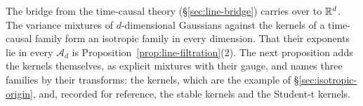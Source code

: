 The bridge from the time-causal theory (\S\ref{sec:line-bridge}) carries over to $\mathbb{R}^d$. The
variance mixtures of $d$-dimensional Gaussians against the kernels of a time-causal family form
an isotropic family in every dimension. That their exponents lie in every $\mathcal{A}_d$ is
Proposition~\ref{prop:line-filtration}(2). The next proposition adds the kernels themselves, as
explicit mixtures with their gauge, and names three families by their transforms: the \Matern{}
kernels, which are the example of \S\ref{sec:isotropic-origin}, and, recorded for reference, the
stable kernels and the Student-t kernels.

